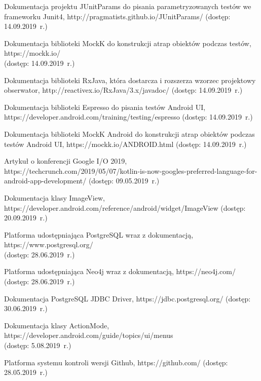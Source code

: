 \begin{thebibliography}{3}
   Dokumentacja projektu JUnitParams do pisania parametryzowanych testów we frameworku Junit4, http://pragmatists.github.io/JUnitParams/ (dostęp: 14.09.2019~r.)
  
   Dokumentacja biblioteki MockK do konstrukcji atrap obiektów podczas testów, https://mockk.io/ \\(dostęp: 14.09.2019~r.)
  
   Dokumentacja biblioteki RxJava, która dostarcza i rozszerza wzorzec projektowy obserwator, http://reactivex.io/RxJava/3.x/javadoc/ (dostęp: 14.09.2019~r.) 
  
   Dokumentacja biblioteki Espresso do pisania testów Android UI, https://developer.android.com/training/testing/espresso (dostęp: 14.09.2019~r.)
  
   Dokumentacja biblioteki MockK Android do konstrukcji atrap obiektów podczas testów Android UI, https://mockk.io/ANDROID.html (dostęp: 14.09.2019~r.)
  
   Artykuł o konferencji Google I/O 2019, https://techcrunch.com/2019/05/07/kotlin-is-now-googles-preferred-language-for-android-app-development/ (dostęp: 09.05.2019~r.)
  
   Dokumentacja klasy ImageView, https://developer.android.com/reference/android/widget/ImageView (dostęp: 20.09.2019~r.)
  
   Platforma udostępniająca PostgreSQL wraz z dokumentacją, https://www.postgresql.org/ \\(dostęp: 28.06.2019~r.)
  
   Platforma udostępniająca Neo4j wraz z dokumentacją, https://neo4j.com/ (dostęp: 28.06.2019~r.)
  
  Dokumentacja PostgreSQL JDBC Driver, https://jdbc.postgresql.org/ (dostęp: 30.06.2019~r.)
  
   Dokumentacja klasy ActionMode, https://developer.android.com/guide/topics/ui/menus \\(dostęp: 5.08.2019~r.)
  
   Platforma systemu kontroli wersji Github, https://github.com/ (dostęp: 28.05.2019~r.)

  
\end{thebibliography}